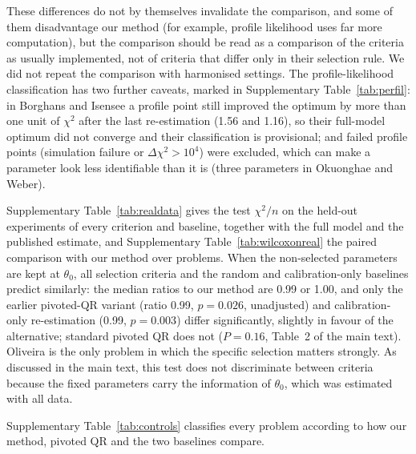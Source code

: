 These differences do not by themselves invalidate the comparison, and some of them disadvantage our method (for example, profile likelihood uses far more computation), but the comparison should be read as a comparison of the criteria as usually implemented, not of criteria that differ only in their selection rule. We did not repeat the comparison with harmonised settings. The profile-likelihood classification has two further caveats, marked in Supplementary Table~\ref{tab:perfil}: in Borghans and Isensee a profile point still improved the optimum by more than one unit of $\chi^2$ after the last re-estimation (1.56 and 1.16), so their full-model optimum did not converge and their classification is provisional; and failed profile points (simulation failure or $\Delta\chi^2>10^4$) were excluded, which can make a parameter look less identifiable than it is (three parameters in Okuonghae and Weber).

{\scriptsize\setlength{\tabcolsep}{3pt}

}


Supplementary Table~\ref{tab:realdata} gives the test $\chi^2/n$ on the held-out experiments of every criterion and baseline, together with the full model and the published estimate, and Supplementary Table~\ref{tab:wilcoxonreal} the paired comparison with our method over problems. When the non-selected parameters are kept at $\theta_0$, all selection criteria and the random and calibration-only baselines predict similarly: the median ratios to our method are 0.99 or 1.00, and only the earlier pivoted-QR variant (ratio 0.99, $p=0.026$, unadjusted) and calibration-only re-estimation (0.99, $p=0.003$) differ significantly, slightly in favour of the alternative; standard pivoted QR does not ($P=0.16$, Table~2 of the main text). Oliveira is the only problem in which the specific selection matters strongly. As discussed in the main text, this test does not discriminate between criteria because the fixed parameters carry the information of $\theta_0$, which was estimated with all data.

{\scriptsize\setlength{\tabcolsep}{3pt}

}

{\small

}

Supplementary Table~\ref{tab:controls} classifies every problem according to how our method, pivoted QR and the two baselines compare.

